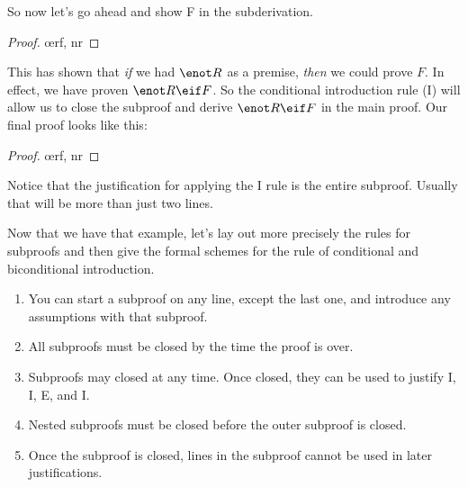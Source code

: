 So now let's go ahead and show F in the subderivation. 

\begin{proof}
	\open
		\oe{rf, nr}
	\close
\end{proof}

This has shown that \emph{if} we had $\enot R$ as a premise, \emph{then} we could prove $F$. In effect, we have proven $\enot R \eif F$. So the conditional introduction rule ({\eif}I) will allow us to close the subproof and derive $\enot R \eif F$ in the main proof. Our final proof looks like this:

\begin{proof}
	\open
		\oe{rf, nr}
	\close
\end{proof}

Notice that the justification for applying the {\eif}I rule is the entire subproof. Usually that will be more than just two lines.


Now that we have that example, let's lay out more precisely the rules for subproofs and then give the formal schemes for the rule of conditional and biconditional introduction. 

\begin{enumerate}[leftmargin=1.5cm]
\item[\define{Rule 1}] You can start a subproof on any line, except the last one, and introduce any assumptions with that subproof.
\item[\define{Rule 2}] All subproofs must be closed by the time the proof is over.
\item[\define{Rule 3}] Subproofs may closed at any time. Once closed, they can be used to justify \eif I, \eiff I, \enot E, and \enot I.
\item[\define{Rule 4}] Nested subproofs must be closed before the outer subproof is closed.
\item[\define{Rule 5}] Once the subproof is closed, lines in the subproof cannot be used in later justifications.
\end{enumerate}

